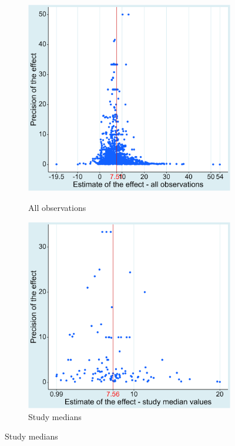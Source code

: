 \begin{figure}[!t]
  \begin{center}
    \caption{The funnel plot shows no immediately suspicious patterns}
    \label{fig:funnel_plot}
    \begin{subfigure}[b]{0.45\textwidth}
      \caption{All observations}
      \includegraphics[width=0.95\linewidth]{Figures/funnel.png}
      \label{fig:funnel_plot_all}
    \end{subfigure}
    \begin{subfigure}[b]{0.45\textwidth}
      \caption{Study medians}
      \includegraphics[width=0.95\linewidth]{Figures/funnel_medians.png}

\end{subfigure}
\end{center}
\end{figure}
